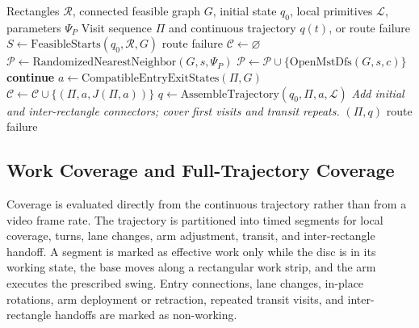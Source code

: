 \begin{algorithm}[htbp]
\caption{Global route planning and trajectory assembly}
\label{alg:global-route}
\small
\begin{algorithmic}[1]
\Require Rectangles $\mathcal R$, connected feasible graph $G$, initial state $q_0$, local primitives $\mathcal L$, parameters $\Psi_P$
\Ensure Visit sequence $\Pi$ and continuous trajectory $q(t)$, or route failure
\State $S\gets\mathrm{FeasibleStarts}(q_0,\mathcal R,G)$
  \State \Return route failure
\EndIf
\State $\mathcal C\gets\varnothing$
  \State $\mathcal P\gets\mathrm{RandomizedNearestNeighbor}(G,s,\Psi_P)$
  \State $\mathcal P\gets\mathcal P\cup\{\mathrm{OpenMstDfs}(G,s,c)\}$ 
      \State \textbf{continue}
    \EndIf
    \State $a\gets\mathrm{CompatibleEntryExitStates}(\Pi,G)$
      \State $\mathcal C\gets\mathcal C\cup\{(\Pi,a,J(\Pi,a))\}$ 
    \EndIf
  \EndFor
\EndFor
{}
  \State $q\gets\mathrm{AssembleTrajectory}(q_0,\Pi,a,\mathcal L)$
  \Statex \hspace{\algorithmicindent}\textit{Add initial and inter-rectangle connectors; cover first visits and transit repeats.}
    \State \Return $(\Pi,q)$
  \EndIf
\EndFor
\State \Return route failure
\end{algorithmic}
\end{algorithm}

\subsection{Work Coverage and Full-Trajectory Coverage}
\label{sec:coverage-evaluation}

Coverage is evaluated directly from the continuous trajectory rather than from a video frame rate. The trajectory is partitioned into timed segments for local coverage, turns, lane changes, arm adjustment, transit, and inter-rectangle handoff. A segment is marked as effective work only while the disc is in its working state, the base moves along a rectangular work strip, and the arm executes the prescribed swing. Entry connections, lane changes, in-place rotations, arm deployment or retraction, repeated transit visits, and inter-rectangle handoffs are marked as non-working.

